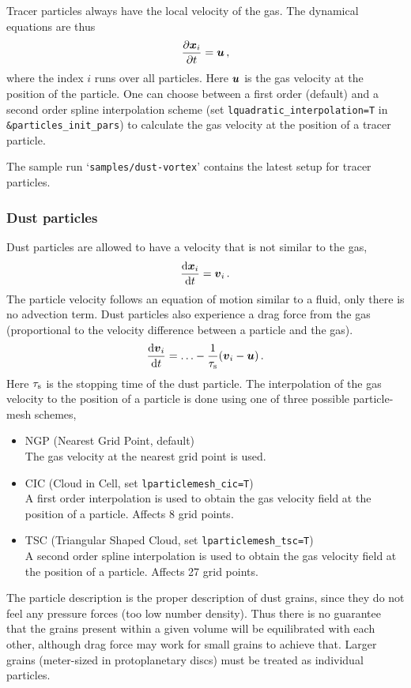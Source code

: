 \documentclass[\mydriver,12pt,twoside,notitlepage,a4paper]{article}
\makeatletter
\newcommand{\code}[1]{\texttt{#1}}
\newcommand{\file}[2][]{%
  \def\index@{#1}%
  `\texttt{#2}'%
  \ifx\index@\@empty\index[file]{#2@\texttt{#2}}%
  \else\index[file]{#1@\texttt{#1}}%
  \fi%
}
\renewcommand{\vec}[1]{\mbox{\boldmath{$#1$}}}
\newcommand{\dd}{{\rm d} {}}
\makeatother
\begin{document}
Tracer particles always have the local velocity of the gas. The dynamical
equations are thus
\begin{equation}
  \frac{\partial \vec{x}_i}{\partial t} = \vec{u} \, ,
\end{equation}
where the index $i$ runs over all particles. Here $\vec{u}$ is the gas velocity
at the position of the particle. One can choose between a first order (default)
and a second order spline interpolation scheme (set
\code{lquadratic_interpolation=T} in \code{\&particles_init_pars}) to
calculate the gas velocity at the position of a tracer particle.

The sample run \file{samples/dust-vortex} contains the latest setup for
tracer particles.

\subsubsection{Dust particles}

Dust particles are allowed to have a velocity that is not similar to the gas,
\begin{equation}
  \frac{\dd \vec{x}_i}{\dd t} = \vec{v}_i \, .
\end{equation}
The particle velocity follows an equation of motion similar to a fluid, only
there is no advection term. Dust particles also experience a drag force from
the gas (proportional to the velocity difference between a particle and the
gas).
\begin{equation}
  \frac{\dd \vec{v}_i}{\dd t} = \ldots -\frac{1}{\tau_{\rm s}}
  (\vec{v}_i-\vec{u}) \, .
\end{equation}
Here $\tau_{\rm s}$ is the stopping time of the dust particle. The
interpolation of the gas velocity to the position of a particle is done using
one of three possible particle-mesh schemes,
\begin{itemize}
  \item NGP (Nearest Grid Point, default)\\
    The gas velocity at the nearest grid point is used.
  \item CIC (Cloud in Cell, set \code{lparticlemesh_cic=T})\\
    A first order interpolation is used to obtain the gas velocity field at
    the position of a particle. Affects 8 grid points.
  \item TSC (Triangular Shaped Cloud, set \code{lparticlemesh_tsc=T})\\
    A second order spline interpolation is used to obtain the gas velocity
    field at the position of a particle. Affects 27 grid points.
\end{itemize}
The particle description is the proper description of
dust grains, since they do not feel any pressure forces (too low number
density). Thus there is no guarantee that the grains present within a given
volume will be equilibrated with each other, although drag force may work for
small grains to achieve that. Larger grains (meter-sized in protoplanetary
discs) must be treated as individual particles.
\end{document}
